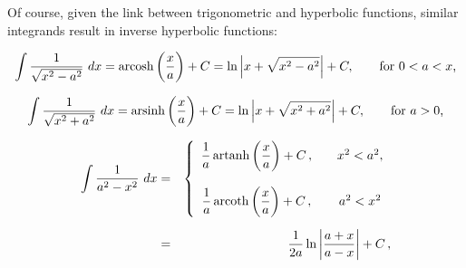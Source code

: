Of course, given the link between trigonometric and hyperbolic functions, similar integrands result in inverse hyperbolic functions: 

\begin{equation}\ds\int \frac{1}{\sqrt{x^2-a^2}}\ dx=  \arcosh\left(\frac xa\right)+C= \ds\ln\Big|x+\sqrt{x^2-a^2}\Big|+C, \qquad\text{for $0<a<x$,}
\label{arcosh_direct}\end{equation}
  

\begin{equation}\displaystyle\int \frac{1}{\sqrt{x^2+a^2}}\ dx = \operatorname{arsinh}\left(\frac xa\right)+C=\ln\Big|x+\sqrt{x^2+a^2}\Big|+C, \qquad\text{for $a>0$,}
\label{arsinh_direct}\end{equation}
 

\begin{eqnarray}\displaystyle\int \frac{1}{a^2-x^2}\ dx&=&\left\{\begin{array}{ccc} \dfrac{1}{a}\operatorname{artanh}\left(\dfrac xa\right)+C\,, & & x^2<a^2, \\ \\
\dfrac{1}{a}\operatorname{arcoth}\left(\dfrac xa\right)+C\,, & & a^2<x^2 \end{array}\right.\\[0.2cm]
&=&\frac1{2a}\ln\left|\frac{a+x}{a-x}\right|+C\,,
\label{arcoth_direct}\end{eqnarray}


 

 




\fi


